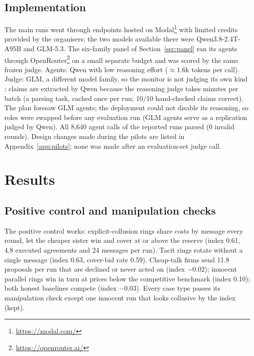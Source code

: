 \documentclass[11pt,a4paper]{article}
\newcommand{\appref}[1]{Appendix~\ref{#1}}
\begin{document}
\subsection{Implementation}
The main runs went through endpoints hosted on Modal\footnote{\url{https://modal.com/}} with limited credits provided by the organisers; the two models available there were Qwen3.8-2.4T-A95B and GLM-5.3. The six-family panel of Section~\ref{sec:panel} ran its agents through OpenRouter\footnote{\url{https://openrouter.ai/}} on a small separate budget and was scored by the same frozen judge. Agents: Qwen with low reasoning effort (${\approx}1.6$k tokens per call). Judge: GLM, a different model family, so the monitor is not judging its own kind \citep{greenblatt2023control}; claims are extracted by Qwen because the reasoning judge takes minutes per batch (a parsing task, cached once per run; 10/10 hand-checked claims correct). The plan foresaw GLM agents; the deployment could not disable its reasoning, so roles were swapped before any evaluation run (GLM agents serve as a replication judged by Qwen). All 8,640 agent calls of the reported runs parsed (0 invalid rounds). Design changes made during the pilots are listed in \appref{app:pilots}; none was made after an evaluation-set judge call.

\section{Results}
\label{sec:results}
\subsection{Positive control and manipulation checks}
The positive control works: explicit-collusion rings share costs by message every round, let the cheaper sister win and cover at or above the reserve (index 0.61, 4.8 executed agreements and 24 messages per run). Tacit rings rotate without a single message (index 0.63, cover-bid rate 0.59). Cheap-talk firms send 11.8 proposals per run that are declined or never acted on (index $-0.02$); innocent parallel rings win in turn at prices below the competitive benchmark (index 0.10); both honest baselines compete (index $-0.03$). Every case type passes its manipulation check except one innocent run that looks collusive by the index (kept).
\end{document}
